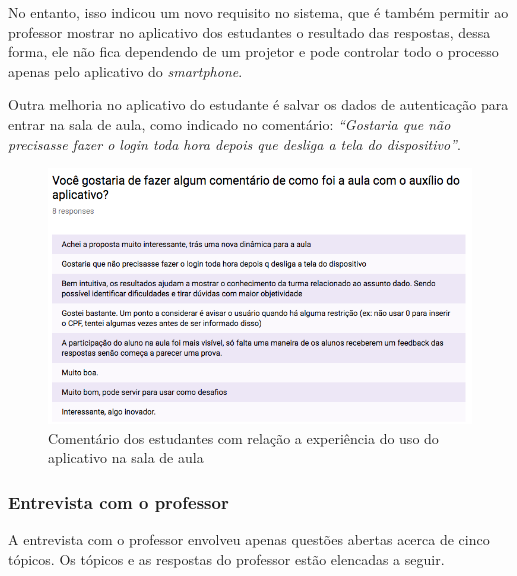 No entanto, isso indicou um novo requisito no sistema, que é também permitir ao professor mostrar
no aplicativo dos estudantes o resultado das respostas, dessa forma, ele não fica dependendo de um
projetor e pode controlar todo o processo apenas pelo aplicativo do \textit{smartphone}.

Outra melhoria no aplicativo do estudante é salvar os dados de autenticação para
entrar na sala de aula, como indicado no comentário: \textit{``Gostaria que não precisasse fazer o login toda hora depois que desliga a tela do dispositivo''}.

\begin{figure}[H]
  \centering
  \caption{Comentário dos estudantes com relação a experiência do uso do aplicativo na sala de aula}
  \label{fig:students_opnions}
  \includegraphics[scale=.65]{imagens/students_opnions}
  \doautor
\end{figure}

\subsubsection{Entrevista com o professor}

A entrevista com o professor envolveu apenas questões abertas acerca de cinco tópicos.
Os tópicos e as respostas do professor estão elencadas a seguir.

